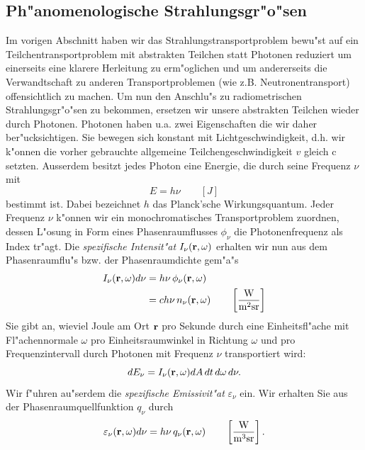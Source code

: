 	\subsection{Ph"anomenologische Strahlungsgr"o"sen}\label{subsec:strahlungsgroessen}
	Im vorigen Abschnitt haben wir das Strahlungstransportproblem bewu"st auf ein Teilchentransportproblem mit abstrakten Teilchen statt Photonen reduziert um einerseits eine klarere Herleitung zu erm"oglichen und um andererseits die Verwandtschaft zu anderen Transportproblemen (wie z.B. Neutronentransport) offensichtlich zu machen. Um nun den Anschlu"s zu radiometrischen Strahlungsgr"o"sen zu bekommen, ersetzen wir unsere abstrakten Teilchen wieder durch Photonen. Photonen haben u.a. zwei Eigenschaften die wir daher ber"ucksichtigen. Sie bewegen sich konstant mit Lichtgeschwindigkeit, d.h. wir k"onnen die vorher gebrauchte allgemeine Teilchengeschwindigkeit $v$ gleich $\text{c}$ setzten. Ausserdem besitzt jedes Photon eine Energie, die durch seine Frequenz $\nu$ mit 
	$$E=h\nu \qquad[J]$$
	bestimmt ist. Dabei bezeichnet $h$ das Planck'sche Wirkungsquantum.
	Jeder Frequenz $\nu$ k"onnen wir ein monochromatisches Transportproblem zuordnen, dessen L"osung in Form eines Phasenraumflusses $\phi_\nu$ die Photonenfrequenz als Index tr"agt.
	Die {\em spezifische Intensit"at} $I_\nu(\mathbf{r},\omega)$ erhalten wir nun aus dem Phasenraumflu"s bzw. der Phasenraumdichte gem"a"s
	\begin{align}\label{eq:intensity_def}
		I_\nu(\mathbf{r},\omega)d\nu & = h\nu\,\phi_\nu(\mathbf{r},\omega)\\
		                       & = c h\nu\,n_\nu(\mathbf{r},\omega) \qquad \left[\frac{\text{W}}{\text{m}^2\text{sr}}\right] \nonumber
	\end{align}
	Sie gibt an, wieviel Joule am Ort $\mathbf{r}$ pro Sekunde durch eine Einheitsfl"ache mit Fl"achennormale $\omega$ pro Einheitsraumwinkel in Richtung $\omega$ und pro Frequenzintervall durch Photonen mit Frequenz $\nu$ transportiert wird:
	$$dE_\nu=I_\nu(\mathbf{r},\omega) dA\,dt\,d\omega\,d\nu.$$
	Wir f"uhren au"serdem die {\em spezifische Emissivit"at} $\varepsilon_\nu$ ein. Wir erhalten Sie aus der Phasenraumquellfunktion $q_\nu$ durch
	\begin{equation}\label{eq:emissivity_def}
		\varepsilon_\nu(\mathbf{r},\omega)d\nu = h\nu\,q_\nu(\mathbf{r},\omega) \qquad \left[\frac{\text{W}}{\text{m}^3\text{sr}}\right].
	\end{equation}
	

